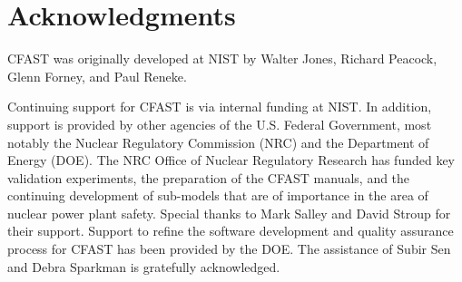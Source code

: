 

\chapter{Acknowledgments}

\label{acksection}

CFAST was originally developed at NIST by Walter Jones, Richard Peacock, Glenn Forney, and Paul Reneke.

Continuing support for CFAST is via internal funding at NIST. In addition, support is provided by other agencies of the U.S. Federal Government, most notably the Nuclear Regulatory Commission (NRC) and the Department of Energy (DOE). The NRC Office of Nuclear Regulatory Research has funded key validation experiments, the preparation of the CFAST manuals, and the continuing development of sub-models that are of importance in the area of nuclear power plant safety. Special thanks to Mark Salley and David Stroup for their support. Support to refine the software development and quality assurance process for CFAST has been provided by the DOE. The assistance of Subir Sen and Debra Sparkman is gratefully acknowledged.
